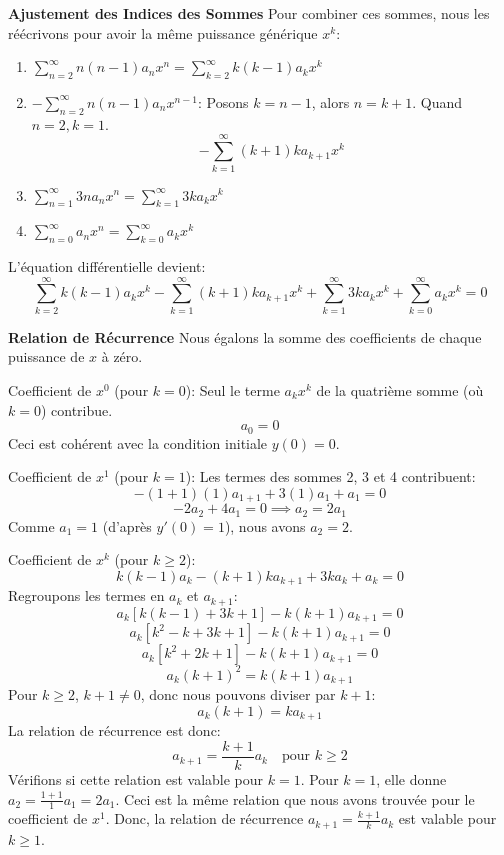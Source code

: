 {{\textbf{Ajustement des Indices des Sommes}
Pour combiner ces sommes, nous les réécrivons pour avoir la même puissance générique $x^k$:
\begin{enumerate}
    \item $\sum_{n=2}^{\infty} n(n-1)a_n x^n = \sum_{k=2}^{\infty} k(k-1)a_k x^k$
    \item $-\sum_{n=2}^{\infty} n(n-1)a_n x^{n-1}$: Posons $k=n-1$, alors $n=k+1$. Quand $n=2, k=1$.
    $$-\sum_{k=1}^{\infty} (k+1)k a_{k+1} x^k$$
    \item $\sum_{n=1}^{\infty} 3n a_n x^n = \sum_{k=1}^{\infty} 3k a_k x^k$
    \item $\sum_{n=0}^{\infty} a_n x^n = \sum_{k=0}^{\infty} a_k x^k$
\end{enumerate}
L'équation différentielle devient:
$$\sum_{k=2}^{\infty} k(k-1)a_k x^k - \sum_{k=1}^{\infty} (k+1)k a_{k+1} x^k + \sum_{k=1}^{\infty} 3k a_k x^k + \sum_{k=0}^{\infty} a_k x^k = 0$$

\textbf{Relation de Récurrence}
Nous égalons la somme des coefficients de chaque puissance de $x$ à zéro.

Coefficient de $x^0$ (pour $k=0$):
Seul le terme $a_k x^k$ de la quatrième somme (où $k=0$) contribue.
$$a_0 = 0$$
Ceci est cohérent avec la condition initiale $y(0)=0$.

Coefficient de $x^1$ (pour $k=1$):
Les termes des sommes 2, 3 et 4 contribuent:
$$-(1+1)(1)a_{1+1} + 3(1)a_1 + a_1 = 0$$
$$-2a_2 + 4a_1 = 0 \implies a_2 = 2a_1$$
Comme $a_1=1$ (d'après $y'(0)=1$), nous avons $a_2=2$.

Coefficient de $x^k$ (pour $k \ge 2$):
$$k(k-1)a_k - (k+1)k a_{k+1} + 3k a_k + a_k = 0$$
Regroupons les termes en $a_k$ et $a_{k+1}$:
$$a_k [k(k-1) + 3k + 1] - k(k+1)a_{k+1} = 0$$
$$a_k [k^2-k+3k+1] - k(k+1)a_{k+1} = 0$$
$$a_k [k^2+2k+1] - k(k+1)a_{k+1} = 0$$
$$a_k (k+1)^2 = k(k+1)a_{k+1}$$
Pour $k \ge 2$, $k+1 \neq 0$, donc nous pouvons diviser par $k+1$:
$$a_k (k+1) = k a_{k+1}$$
La relation de récurrence est donc:
$$a_{k+1} = \frac{k+1}{k} a_k \quad \text{pour } k \ge 2$$
Vérifions si cette relation est valable pour $k=1$. Pour $k=1$, elle donne $a_2 = \frac{1+1}{1} a_1 = 2a_1$. Ceci est la même relation que nous avons trouvée pour le coefficient de $x^1$.
Donc, la relation de récurrence $a_{k+1} = \frac{k+1}{k} a_k$ est valable pour $k \ge 1$.

}}
